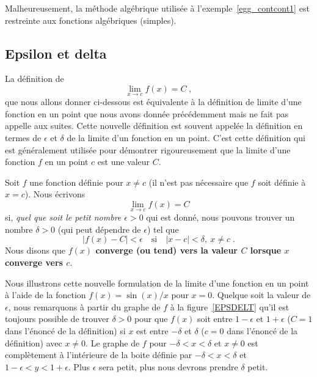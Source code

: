 {Malheureusement, la méthode algébrique utilisée à
l'exemple~\ref{egg_contcont1} est restreinte aux fonctions algébriques
(simples).

\subsection{Epsilon et delta \theory}

La définition de
\[
\lim_{x\rightarrow c} f(x) = C \; ,
\]
que nous allons donner ci-dessous est équivalente à la définition de
limite d'une fonction en un point que nous avons donnée précédemment mais
ne fait pas appelle aux suites.  Cette nouvelle définition est souvent
appelée la définition en termes de $\epsilon$ et $\delta$ de la limite
d'un fonction en un point.  C'est cette définition qui est généralement
utilisée pour démontrer rigoureusement que la limite d'une fonction
$f$ en un point $c$ est une valeur $C$.

\begin{defn} 
Soit $f$ une fonction définie pour $x \neq c$ (il n'est pas
nécessaire que $f$ soit définie à $x=c$).  Nous écrivons
\[
\lim_{x\rightarrow c} f(x) = C
\]
si, {\em quel que soit le petit nombre $\epsilon >0$} qui est donné,
nous pouvons trouver un nombre $\delta >0$ (qui peut dépendre de
$\epsilon$) tel que
\[
| f(x) - C | < \epsilon \quad \text{si} \quad |x-c|<\delta,\ x\neq c \; .
\]
Nous disons que {\bfseries $f(x)$ converge (ou tend) vers la valeur $C$
lorsque $x$ converge vers $c$}.
\label{def2_conv}
\end{defn}


Nous illustrons cette nouvelle formulation de la limite d'une fonction
en un point à l'aide de la fonction $f(x) = \sin(x)/x$ pour $x=0$.
Quelque soit la valeur de $\epsilon$, nous remarquons à partir du graphe
de $f$ à la figure~\ref{EPSDELT} qu'il est toujours possible de trouver
$\delta>0$ pour que $f(x)$ soit entre $1-\epsilon$ et $1+\epsilon$
($C=1$ dans l'énoncé de la définition) si $x$ est entre $-\delta$ et
$\delta$ ($c=0$ dans l'énoncé de la définition) avec $x \neq 0$.  Le
graphe de $f$ pour $-\delta < x < \delta$ et $x\neq 0$ est
complètement à l'intérieure de la boite définie par
$-\delta < x < \delta$ et $1-\epsilon < y < 1+\epsilon$. 
Plus $\epsilon$ sera petit, plus nous devrons prendre $\delta$ petit.

}
